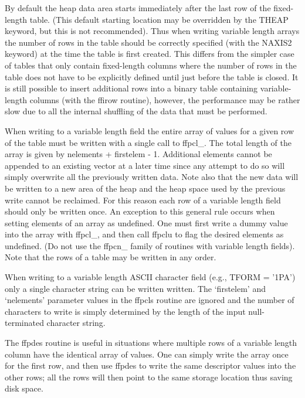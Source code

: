 By default the heap data area starts immediately after the last row of
the fixed-length table.  (This default starting location may be
overridden by the THEAP keyword, but this is not recommended).  Thus
when writing variable length arrays the number of rows in the table
should be correctly specified (with the NAXIS2 keyword) at the time the
table is first created.  This differs from the simpler case of tables
that only contain fixed-length columns where the number of rows in the
table does not have to be explicitly defined until just before the
table is closed.  It is still possible to insert additional rows into a
binary table containing variable-length columns (with the ffirow
routine), however, the performance may be rather slow due to all the
internal shuffling of the data that must be performed.

When writing to a variable length field the entire array of values for
a given row of the table must be written with a single call to
ffpcl\_.  The total length of the array is given by nelements +
firstelem - 1.  Additional elements cannot be appended to an existing
vector at a later time since any attempt to do so will simply overwrite
all the previously written data.  Note also that the new data will be
written to a new area of the heap and the heap space used by the
previous write cannot be reclaimed.  For this reason each row of a
variable length field should only be written once.  An exception to
this general rule occurs when setting elements of an array as
undefined.  One must first write a dummy value into the array with
ffpcl\_, and then call ffpclu to flag the desired elements as
undefined.  (Do not use the ffpcn\_ family of routines with variable
length fields). Note that the rows of a table may be written in any
order.

When writing to a variable length ASCII character field (e.g., TFORM =
'1PA') only a single character string can be written written.  The
`firstelem' and `nelements' parameter values in the ffpcls routine are
ignored and the number of characters to write is simply determined by
the length of the input null-terminated character string.

The ffpdes routine is useful in situations where multiple rows of a
variable length column have the identical array of values.  One can
simply write the array once for the first row, and then use ffpdes to
write the same descriptor values into the other rows;  all the rows
will then point to the same storage location thus saving disk space.

